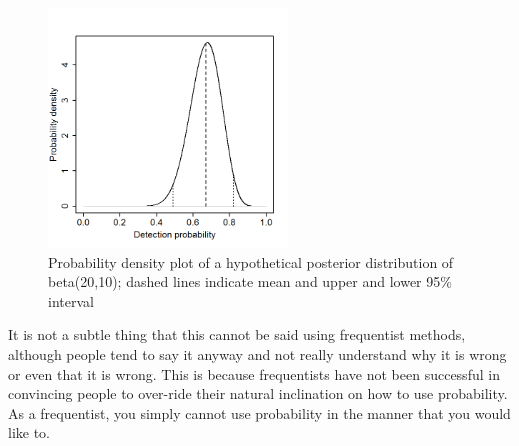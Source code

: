 \begin{figure}
\begin{center}
\includegraphics[height=2.5in]{Ch2-Bayes/figs/densityvsdetection}
\end{center}
\caption{Probability density plot of a hypothetical
 posterior distribution of beta(20,10); dashed lines 
 indicate mean and upper and lower 95\% interval}
\label{densityvsdetection.fig}
\end{figure}

It is not a subtle thing that this
cannot be said using frequentist methods, although people tend to say
it anyway and not really understand why it is wrong or even that it is
wrong. This is  because %
frequentists have not been successful in convincing people to
over-ride their natural inclination on how to use probability.  As a
frequentist, you simply cannot use probability in the manner that you
would like to.

